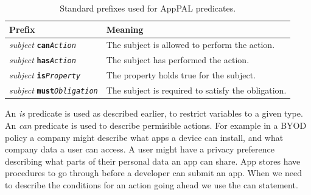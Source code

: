 \documentclass[thesis.tex]{subfiles}
\begin{document}
\newcommand{\descPred}[2]{\emph{subject} \texttt{\textbf{#1}\emph{#2}}}
\begin{table}
  \begin{tabular}{l l}
    \toprule
    Prefix                      & Meaning                                            \\
    \midrule
    \descPred{can}{Action}      & The subject is allowed to perform the action.      \\
    \descPred{has}{Action}      & The subject has performed the action.              \\
    \descPred{is}{Property}     & The property holds true for the subject.           \\
    \descPred{must}{Obligation} & The subject is required to satisfy the obligation. \\
    \bottomrule
  \end{tabular}
  \caption{Standard prefixes used for AppPAL predicates.}
  \label{tab:predicate-prefixes}
\end{table}

An \emph{is} predicate is used as described earlier, to restrict variables to a given type.
An \emph{can} predicate is used to describe permisible actions.
For example in a \ac{BYOD} policy a company might describe what apps a device can install, and what company data a user can access.
A user might have a privacy preference describing what parts of their personal data an app can share.
App stores have procedures to go through before a developer can submit an app. 
When we need to describe the conditions for an action going ahead we use the can statement.
\end{document}
